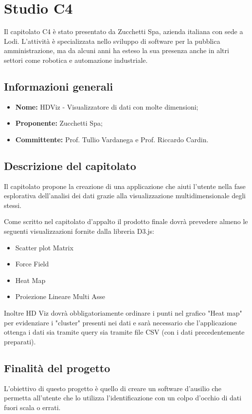 \section{Studio C4}
Il capitolato C4 è stato presentato da Zucchetti Spa, azienda italiana con sede a Lodi. L'attività è specializzata nello sviluppo di software per la pubblica amministrazione, ma da alcuni anni ha esteso la sua presenza anche in altri settori come robotica e automazione industriale.

\subsection{Informazioni generali}
\begin{itemize}
    \item \textbf{Nome:} HDViz - Visualizzatore di dati con molte dimensioni;
    \item \textbf{Proponente:} Zucchetti Spa;
    \item \textbf{Committente:} Prof. Tullio Vardanega e Prof. Riccardo Cardin.
\end{itemize}

\subsection{Descrizione del capitolato}
Il capitolato propone la creazione di una applicazione che aiuti l'utente nella fase esplorativa dell'analisi dei dati grazie alla visualizzazione multidimensionale degli stessi.

Come scritto nel capitolato d'appalto il prodotto finale dovrà prevedere almeno le seguenti visualizzazioni fornite dalla libreria D3.js:
\begin{itemize}
    \item Scatter plot Matrix
    \item Force Field
    \item Heat Map
    \item Proiezione Lineare Multi Asse
\end{itemize}

Inoltre HD Viz dovrà obbligatoriamente ordinare i punti nel grafico "Heat map" per evidenziare i "cluster" presenti nei dati e sarà necessario che l'applicazione ottenga i dati sia tramite query sia tramite file CSV (con i dati precedentemente preparati).

\subsection{Finalità del progetto}
L'obiettivo di questo progetto è quello di creare un software d'ausilio che permetta all'utente che lo utilizza l'identificazione con un colpo d'occhio di dati fuori scala o errati.

